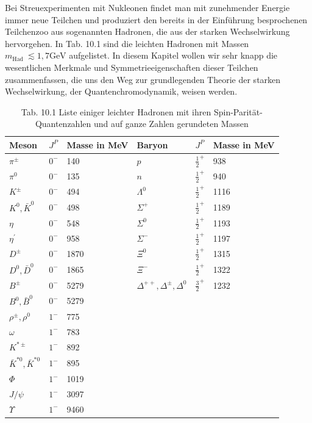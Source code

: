 \documentclass[10pt, letterpaper]{article}
\begin{document}
Bei Streuexperimenten mit Nukleonen findet man mit zunehmender Energie immer neue Teilchen und produziert den bereits in der Einführung besprochenen Teilchenzoo aus sogenannten Hadronen, die aus der starken Wechselwirkung hervorgehen. In Tab. 10.1 sind die leichten Hadronen mit Massen $m_{\text {Had }} \lesssim 1,7 \mathrm{GeV}$ aufgelistet. In diesem Kapitel wollen wir sehr knapp die wesentlichen Merkmale und Symmetrieeigenschaften dieser Teilchen zusammenfassen, die uns den Weg zur grundlegenden Theorie der starken Wechselwirkung, der Quantenchromodynamik, weisen werden.

\begin{table}[h]
\begin{center}

\caption{Tab. 10.1 Liste einiger leichter Hadronen mit ihren Spin-Parität-Quantenzahlen und auf ganze Zahlen gerundeten Massen}
\begin{tabular}{|l|l|l|l|l|l|}
\hline
Meson & $J^{P}$ & Masse in MeV & Baryon & $J^{P}$ & Masse in MeV \\
\hline
$\pi^{ \pm}$ & $0^{-}$ & 140 & $p$ & $\frac{1}{2}^{+}$ & 938 \\
\hline
$\pi^{0}$ & $0^{-}$ & 135 & $n$ & $\frac{1}{2}^{+}$ & 940 \\
\hline
$K^{ \pm}$ & $0^{-}$ & 494 & $\Lambda^{0}$ & $\frac{1}{2}^{+}$ & 1116 \\
\hline
$K^{0}, \bar{K}^{0}$ & $0^{-}$ & 498 & $\Sigma^{+}$ & $\frac{1}{2}^{+}$ & 1189 \\
\hline
$\eta$ & $0^{-}$ & 548 & $\Sigma^{0}$ & $\frac{1}{2}^{+}$ & 1193 \\
\hline
$\eta^{\prime}$ & $0^{-}$ & 958 & $\Sigma^{-}$ & $\frac{1}{2}^{+}$ & 1197 \\
\hline
$D^{ \pm}$ & $0^{-}$ & 1870 & $\Xi^{0}$ & $\frac{1}{2}^{+}$ & 1315 \\
\hline
$D^{0}, \bar{D}^{0}$ & $0^{-}$ & 1865 & $\Xi^{-}$ & $\frac{1}{2}^{+}$ & 1322 \\
\hline
$B^{ \pm}$ & $0^{-}$ & 5279 & $\Delta^{++}, \Delta^{ \pm}, \Delta^{0}$ & $\frac{3}{2}^{+}$ & 1232 \\
\hline
$B^{0}, \bar{B}^{0}$ & $0^{-}$ & 5279 &  &  &  \\
\hline
$\rho^{ \pm}, \rho^{0}$ & $1^{-}$ & 775 &  &  &  \\
\hline
$\omega$ & $1^{-}$ & 783 &  &  &  \\
\hline
$K^{* \pm}$ & $1^{-}$ & 892 &  &  &  \\
\hline
$\bar{K}^{* 0}, \bar{K}^{* 0}$ & $1^{-}$ & 895 &  &  &  \\
\hline
$\Phi$ & $1^{-}$ & 1019 &  &  &  \\
\hline
$J / \psi$ & $1^{-}$ & 3097 &  &  &  \\
\hline
$\Upsilon$ & $1^{-}$ & 9460 &  &  &  \\
\hline
\end{tabular}
\end{center}
\end{table}
\end{document}
